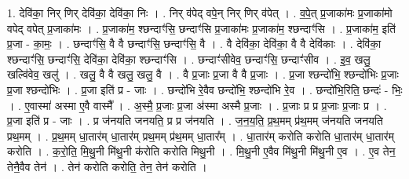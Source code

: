 \documentclass[17pt]{extarticle}
\begin{document}
1. देवि॑का॒ निर् णिर् देवि॑का॒ देवि॑का॒ निः । . निर् व॑पेद् वपे॒न् निर् णिर् व॑पेत् । . व॒पे॒त् प्र॒जाका॑मः प्र॒जाका॑मो वपेद् वपेत् प्र॒जाका॑मः । . प्र॒जाका॑म॒ श्छन्दाꣳ॑सि॒ छन्दाꣳ॑सि प्र॒जाका॑मः प्र॒जाका॑म॒ श्छन्दाꣳ॑सि । . प्र॒जाका॑म॒ इति॑ प्र॒जा - का॒मः॒ । . छन्दाꣳ॑सि॒ वै वै छन्दाꣳ॑सि॒ छन्दाꣳ॑सि॒ वै । . वै देवि॑का॒ देवि॑का॒ वै वै देवि॑काः । . देवि॑का॒ श्छन्दाꣳ॑सि॒ छन्दाꣳ॑सि॒ देवि॑का॒ देवि॑का॒ श्छन्दाꣳ॑सि । . छन्दाꣳ॑सीवेव॒ छन्दाꣳ॑सि॒ छन्दाꣳ॑सीव । . इ॒व॒ खलु॒ खल्वि॑वेव॒ खलु॑ । . खलु॒ वै वै खलु॒ खलु॒ वै । . वै प्र॒जाः प्र॒जा वै वै प्र॒जाः । . प्र॒जा श्छन्दो॑भि॒ श्छन्दो॑भिः प्र॒जाः प्र॒जा श्छन्दो॑भिः । . प्र॒जा इति॑ प्र - जाः । . छन्दो॑भि रे॒वैव छन्दो॑भि॒ श्छन्दो॑भि रे॒व । . छन्दो॑भि॒रिति॒ छन्दः॑ - भिः॒ । . ए॒वास्मा॑ अस्मा ए॒वै वास्मै᳚ । . अ॒स्मै॒ प्र॒जाः प्र॒जा अ॑स्मा अस्मै प्र॒जाः । . प्र॒जाः प्र प्र प्र॒जाः प्र॒जाः प्र । . प्र॒जा इति॑ प्र - जाः । . प्र ज॑नयति जनयति॒ प्र प्र ज॑नयति । . ज॒न॒य॒ति॒ प्र॒थ॒मम् प्र॑थ॒मम् ज॑नयति जनयति प्रथ॒मम् । . प्र॒थ॒मम् धा॒तार॑म् धा॒तार॑म् प्रथ॒मम् प्र॑थ॒मम् धा॒तार᳚म् । . धा॒तार॑म् करोति करोति धा॒तार॑म् धा॒तार॑म् करोति । . क॒रो॒ति॒ मि॒थु॒नी मि॑थु॒नी क॑रोति करोति मिथु॒नी । . मि॒थु॒नी ए॒वैव मि॑थु॒नी मि॑थु॒नी ए॒व । . ए॒व तेन॒ तेनै॒वैव तेन॑ । . तेन॑ करोति करोति॒ तेन॒ तेन॑ करोति । \newline
\end{document}
